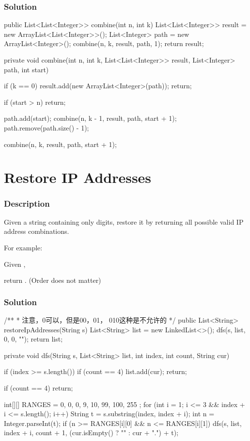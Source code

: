 \subsubsection{Solution}

\begin{Code}
public List<List<Integer>> combine(int n, int k) {
    List<List<Integer>> result = new ArrayList<List<Integer>>();
    List<Integer> path = new ArrayList<Integer>();
    combine(n, k, result, path, 1);
    return result;
}

private void combine(int n, int k, List<List<Integer>> result, List<Integer> path, int start) {
    if (k == 0) {
        result.add(new ArrayList<Integer>(path));
        return;
    }

    if (start > n) {
        return;
    }

    path.add(start);
    combine(n, k - 1, result, path, start + 1);
    path.remove(path.size() - 1);

    combine(n, k, result, path, start + 1);
}
\end{Code}

\newpage

\section{Restore IP Addresses} %

\subsubsection{Description}

Given a string containing only digits, restore it by returning all possible valid IP address combinations.

For example:

Given ,

return \code{["255.255.11.135", "255.255.111.35"]}. (Order does not matter)

\subsubsection{Solution}

\begin{Code}
/**
 * 注意，0可以，但是00，01， 010这种是不允许的
 */
public List<String> restoreIpAddresses(String s) {
    List<String> list = new LinkedList<>();
    dfs(s, list, 0, 0, "");
    return list;
}

private void dfs(String s, List<String> list, int index, int count, String cur) {
    if (index >= s.length()) {
        if (count == 4) {
            list.add(cur);
        }
        return;
    }

    if (count == 4) {
        return;
    }

    int[][] RANGES = {
            {0, 0}, {0, 9}, {10, 99}, {100, 255}
    };
    for (int i = 1; i <= 3 && index + i <= s.length(); i++) {
        String t = s.substring(index, index + i);
        int n = Integer.parseInt(t);
        if (n >= RANGES[i][0] && n <= RANGES[i][1]) {
            dfs(s, list, index + i, count + 1, (cur.isEmpty() ? "" : cur + ".") + t);
        }
    }
}
\end{Code}

